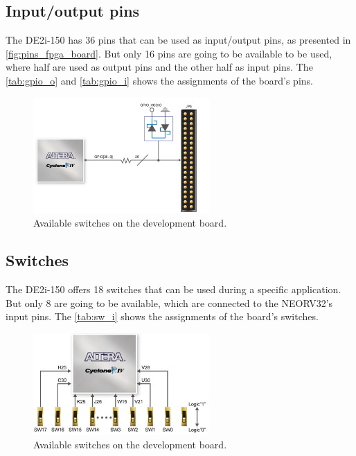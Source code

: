        \subsection{Input/output pins}
            The DE2i-150 has 36 pins that can be used as input/output pins, as presented in \autoref{fig:pins_fpga_board}. But only 16 pins are going to be available to be used, where half are used as output pins and the other half as input pins. The \autoref{tab:gpio_o} and \autoref{tab:gpio_i} shows the assignments of the board's pins.
        
            \begin{figure}[!ht]
                \begin{center}
                    \includegraphics[width= 0.6\textwidth]{figures/pins_fpga_board.png}
                    \caption{\label{fig:pins_fpga_board} Available switches on the development board.}
                \end{center}
            \end{figure}    
        
        \subsection{Switches}
            The DE2i-150 offers 18 switches that can be used during a specific application. But only 8 are going to be available, which are connected to the NEORV32's input pins. The \autoref{tab:sw_i} shows the assignments of the board's switches.
            
            \begin{figure}[!ht]
                \begin{center}
                    \includegraphics[width= 0.6\textwidth]{figures/sw_fpga_board.png}
                    \caption{\label{fig:sw_fpga_board} Available switches on the development board.}
                \end{center}
            \end{figure}
        

